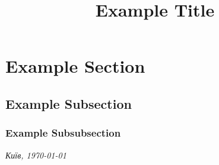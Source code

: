 \documentclass[
a4paper,
12pt,
onehalfspacing,
headsepline,
notitlepage,
normalheadings,
twoside,
DIVcalc]{article}
\date{}
\author{}
\title{Example Title}
\begin{document}
\maketitle




\section{Example Section}

\subsection{Example Subsection}

\subsubsection{Example Subsubsection}

\blindtext

\begin{multicols}{2}
\blindtext
\end{multicols}
\newpage

\begin{flushright}
\textit{Київ, \today}
\end{flushright}
\end{document}
